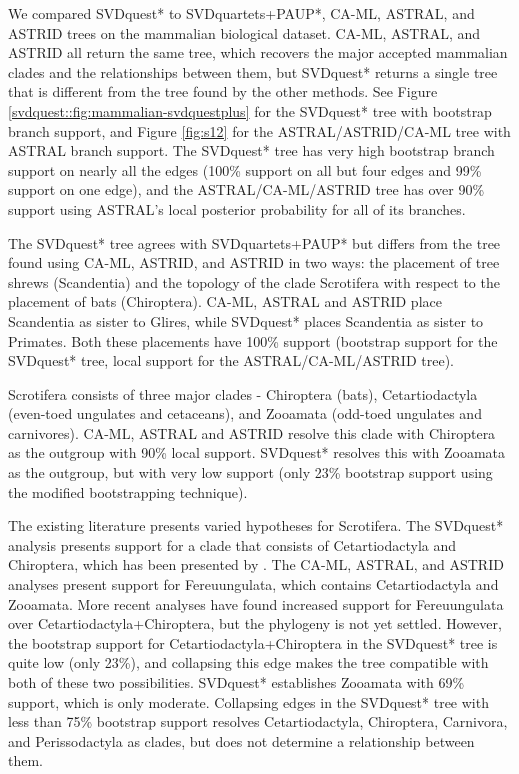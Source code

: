 We compared SVDquest* to  SVDquartets+PAUP*, CA-ML, ASTRAL, and ASTRID trees
on the mammalian biological dataset.
CA-ML, ASTRAL, and ASTRID all return the same tree, 
which recovers the major accepted mammalian clades and
the relationships between them, but SVDquest* 
 {returns a  single tree that is different from the tree found
 by the other methods.}
 {See Figure \ref{svdquest::fig:mammalian-svdquestplus} for the SVDquest* tree with bootstrap branch support, and Figure \ref{fig:s12} for the ASTRAL/ASTRID/CA-ML tree with ASTRAL branch support. }
 The SVDquest* tree has very high bootstrap branch support on
nearly all the edges (100\% support on all but four edges and 99\% support on one edge), and the ASTRAL/CA-ML/ASTRID tree has over 90\% support using ASTRAL's local posterior probability for all of its branches.


 

The SVDquest* tree  agrees with SVDquartets+PAUP*  but differs from
the tree found using CA-ML, ASTRID, and ASTRID in two ways: the placement of tree shrews
(Scandentia) and the topology of the clade Scrotifera with respect to
the placement of bats (Chiroptera).
CA-ML, ASTRAL and ASTRID place
Scandentia as sister to Glires, while SVDquest* places Scandentia as
sister to Primates. 
Both these placements have 100\% support 
(bootstrap support for the SVDquest* tree,
local support for the ASTRAL/CA-ML/ASTRID tree). 


Scrotifera consists of three major clades - Chiroptera (bats),
Cetartiodactyla (even-toed ungulates and cetaceans), and Zooamata
(odd-toed ungulates and carnivores). 
CA-ML, ASTRAL and ASTRID resolve
this clade with Chiroptera as the outgroup with 90\% local
support. SVDquest* resolves this with Zooamata as the outgroup, but
with very low support (only 23\% bootstrap support using the modified bootstrapping technique).

The existing literature presents varied hypotheses for Scrotifera. The
SVDquest* analysis presents support for a clade that consists of
Cetartiodactyla and Chiroptera, which has been presented by
\cite{hou2009phylogeny}. 
The CA-ML, ASTRAL, and ASTRID analyses
present support for Fereuungulata, which contains Cetartiodactyla and
Zooamata. 
More recent analyses \cite{zhou2012phylogenomic} have found
increased support for Fereuungulata over Cetartiodactyla+Chiroptera,
but the phylogeny is not yet settled.  However, the bootstrap support
for Cetartiodactyla+Chiroptera in the SVDquest* tree is quite low
(only 23\%), and collapsing this edge makes the tree compatible with
both of these two possibilities.  
SVDquest* establishes
Zooamata with 69\% support, which is only moderate. Collapsing
edges in the SVDquest* tree with less than 75\% bootstrap support 
resolves Cetartiodactyla,
Chiroptera, Carnivora, and Perissodactyla as clades, but does not
determine a relationship between them.


